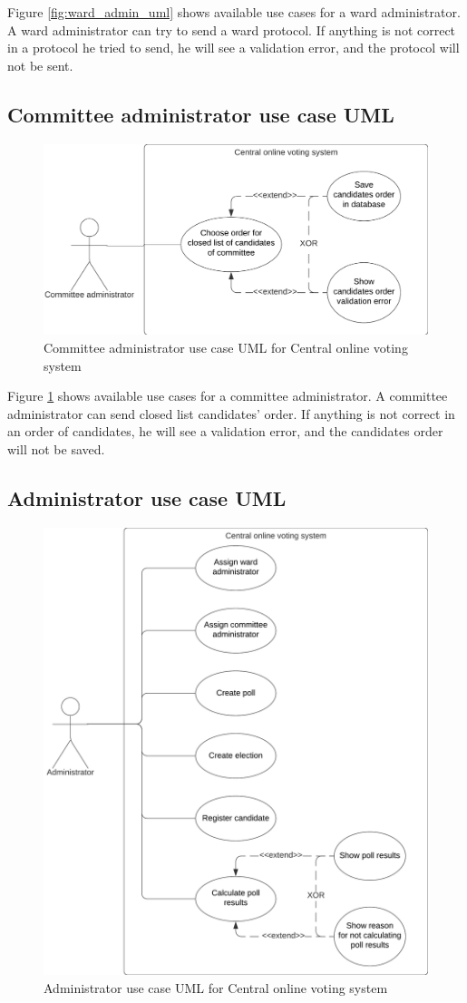 \documentclass[a4paper,twoside,12pt]{book}
\newcommand{\Title}{Central online voting system}
\begin{document}
    Figure \ref{fig:ward_admin_uml} shows available use cases for a ward administrator. A ward administrator can try to send a ward protocol.
    If anything is not correct in a protocol he tried to send, he will see a validation error, and the protocol will not be sent.

    \subsection{Committee administrator use case UML}
    \begin{figure}[h]
      \centering
      \includegraphics[width=0.65\linewidth]{committee_admin_uml.png}
      \caption{Committee administrator use case UML for \Title}
      \label{fig:committee_admin_uml}
    \end{figure}

    Figure \ref{fig:committee_admin_uml} shows available use cases for a committee administrator. A committee administrator can send closed list candidates' order.
    If anything is not correct in an order of candidates, he will see a validation error, and the candidates order will not be saved.
    \pagebreak

    \subsection{Administrator use case UML}
    \begin{figure}[h]
      \centering
      \includegraphics[width=0.8\linewidth]{admin_uml.png}
      \caption{Administrator use case UML for \Title}
      \label{fig:admin_uml}
    \end{figure}
\end{document}
